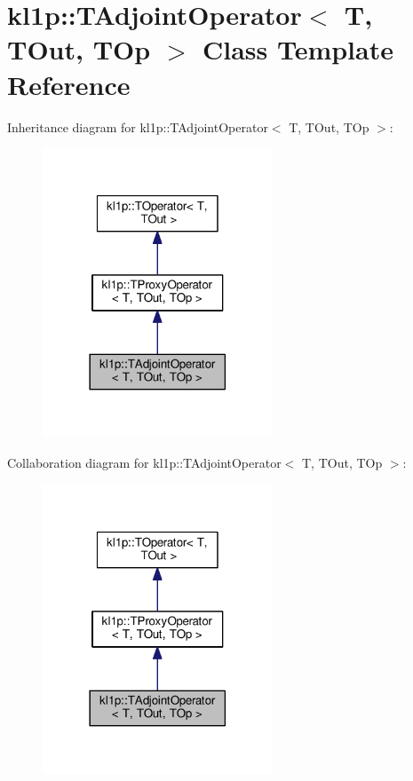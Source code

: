 \hypertarget{classkl1p_1_1TAdjointOperator}{}\section{kl1p\+:\+:T\+Adjoint\+Operator$<$ T, T\+Out, T\+Op $>$ Class Template Reference}
\label{classkl1p_1_1TAdjointOperator}


Inheritance diagram for kl1p\+:\+:T\+Adjoint\+Operator$<$ T, T\+Out, T\+Op $>$\+:
\nopagebreak
\begin{figure}[H]
\begin{center}
\leavevmode
\includegraphics[width=194pt]{classkl1p_1_1TAdjointOperator__inherit__graph}
\end{center}
\end{figure}


Collaboration diagram for kl1p\+:\+:T\+Adjoint\+Operator$<$ T, T\+Out, T\+Op $>$\+:
\nopagebreak
\begin{figure}[H]
\begin{center}
\leavevmode
\includegraphics[width=194pt]{classkl1p_1_1TAdjointOperator__coll__graph}
\end{center}
\end{figure}
